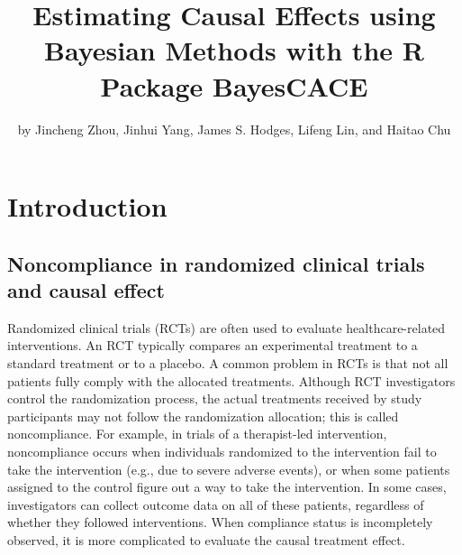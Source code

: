 \title{Estimating Causal Effects using Bayesian Methods with the R Package BayesCACE}
\author{by Jincheng Zhou, Jinhui Yang, James S. Hodges, Lifeng Lin, and Haitao Chu}

\maketitle


\hypertarget{introduction}{%
\section{Introduction}\label{introduction}}

\hypertarget{noncompliance-in-randomized-clinical-trials-and-causal-effect}{%
\subsection{Noncompliance in randomized clinical trials and causal effect}\label{noncompliance-in-randomized-clinical-trials-and-causal-effect}}

Randomized clinical trials (RCTs) are often used to evaluate healthcare-related interventions. An RCT typically compares an experimental treatment to a standard treatment or to a placebo. A common problem in RCTs is that not all patients fully comply with the allocated treatments. Although RCT investigators control the randomization process, the actual treatments received by study participants may not follow the randomization allocation; this is called noncompliance. For example, in trials of a therapist-led intervention, noncompliance occurs when individuals randomized to the intervention fail to take the intervention (e.g., due to severe adverse events), or when some patients assigned to the control figure out a way to take the intervention. In some cases, investigators can collect outcome data on all of these patients, regardless of whether they followed interventions. When compliance status is incompletely observed, it is more complicated to evaluate the causal treatment effect.

